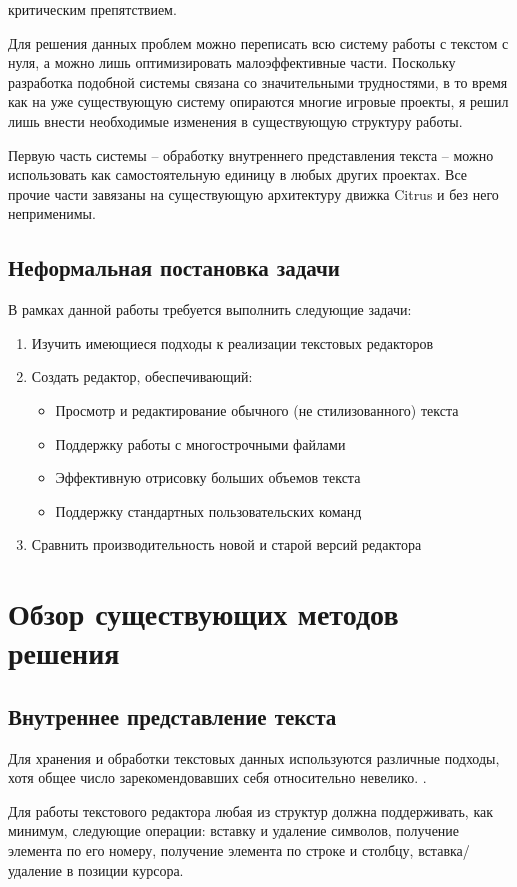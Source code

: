 \documentclass{fefu}
\begin{document}
				критическим препятствием.
				\par Для решения данных проблем можно переписать всю систему работы с текстом с
				нуля, а можно лишь оптимизировать малоэффективные части. Поскольку разработка 
				подобной системы связана со значительными трудностями, в то время как на уже
				существующую систему опираются многие игровые проекты, я решил лишь внести 
				необходимые изменения в существующую структуру работы.
				\par Первую часть системы -- обработку внутреннего представления текста -- 
				можно использовать как самостоятельную единицу в любых других проектах. Все 
				прочие части завязаны на существующую архитектуру движка Citrus и без него 
				неприменимы.
		\subsection{Неформальная постановка задачи}
			В рамках данной работы требуется выполнить следующие задачи:
			\begin{enumerate}
				\item Изучить имеющиеся подходы к реализации текстовых редакторов
				\item Создать редактор, обеспечивающий:
				\begin{itemize}
					\item Просмотр и редактирование обычного (не стилизованного) текста
					\item Поддержку работы с многострочными файлами
					\item Эффективную отрисовку больших объемов текста
					\item Поддержку стандартных пользовательских команд
				\end{itemize}
				\item Сравнить производительность новой и старой версий редактора
			\end{enumerate}
	\section{Обзор существующих методов решения}
		\subsection{Внутреннее представление текста}
			\par Для хранения и обработки текстовых данных используются различные подходы,
				хотя общее число зарекомендовавших себя относительно невелико.
				\cite{TextEditorDataStructures}.
			\par Для работы текстового редактора любая из структур должна поддерживать, как 
			минимум, следующие операции: вставку и удаление символов, получение элемента по его
			номеру, получение элемента по строке и столбцу, вставка/удаление в позиции курсора.
\end{document}
